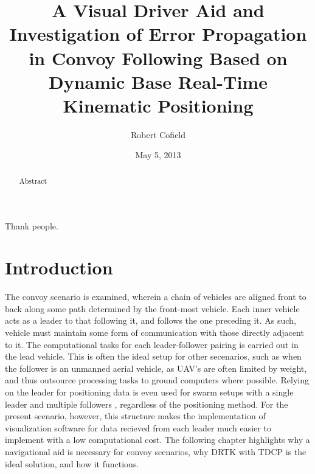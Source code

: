 \documentclass[12pt]{report}
\title{A Visual Driver Aid and Investigation of Error Propagation in Convoy Following Based on Dynamic Base Real-Time Kinematic Positioning}
\author{Robert Cofield}
\date{May 5, 2013}
\begin{document}

\begin{romanpages}

\TitlePage

\begin{abstract}
Abstract
\end{abstract}

\begin{acknowledgments}
Thank people.
\end{acknowledgments}

\tableofcontents
\listoffigures
\listoftables

\printnomenclature[0.75in] 

\end{romanpages}

\normalem       %


\chapter{Introduction}

The convoy scenario is examined, wherein a chain of vehicles are aligned front to back along some path determined by the front-most vehicle. Each inner vehicle acts as a leader to that following it, and follows the one preceding it. As such, vehicle must maintain some form of communication with those directly adjacent to it.
The computational tasks for each leader-follower pairing is carried out in the lead vehicle. This is often the ideal setup for other secenarios, such as when the follower is an unmanned aerial vehicle, as UAV's are often limited by weight, and thus outsource processing tasks to ground computers where possible. Relying on the leader for positioning data is even used for swarm setups with a single leader and multiple followers \cite{gian}, regardless of the positioning method. For the present scenario, however, this structure makes the implementation of visualization software for data recieved from each leader much easier to implement with a low computational cost. The following chapter highlights why a navigational aid is necessary for convoy scenarios, why DRTK with TDCP is the ideal solution, and how it functions.
\end{document}
